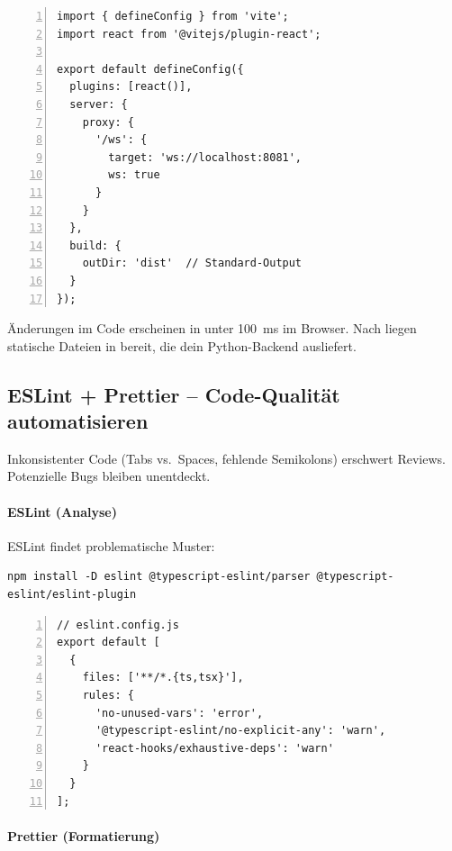 \begin{lstlisting}[style=base,numbers=left,caption={Vite-Konfiguration mit WebSocket-Proxy},label={lst:vite-config}]
import { defineConfig } from 'vite';
import react from '@vitejs/plugin-react';

export default defineConfig({
  plugins: [react()],
  server: {
    proxy: {
      '/ws': {
        target: 'ws://localhost:8081',
        ws: true
      }
    }
  },
  build: {
    outDir: 'dist'  // Standard-Output
  }
});
\end{lstlisting}

\begin{infobox}[Konsequenz]
Änderungen im Code erscheinen in unter \SI{100}{\milli\second} im Browser.
Nach  liegen statische Dateien in  bereit,
die dein Python-Backend ausliefert.
\end{infobox}

\subsection{ESLint + Prettier -- Code-Qualität automatisieren}
\label{subsec:eslint-prettier}

Inkonsistenter Code (Tabs vs.\ Spaces, fehlende Semikolons) erschwert Reviews.
Potenzielle Bugs bleiben unentdeckt.

\paragraph{ESLint (Analyse)}

ESLint findet problematische Muster:

\begin{lstlisting}[style=shell]
npm install -D eslint @typescript-eslint/parser @typescript-eslint/eslint-plugin
\end{lstlisting}

\begin{lstlisting}[style=base,numbers=left,caption={ESLint-Konfiguration},label={lst:eslint-config}]
// eslint.config.js
export default [
  {
    files: ['**/*.{ts,tsx}'],
    rules: {
      'no-unused-vars': 'error',
      '@typescript-eslint/no-explicit-any': 'warn',
      'react-hooks/exhaustive-deps': 'warn'
    }
  }
];
\end{lstlisting}

\paragraph{Prettier (Formatierung)}

